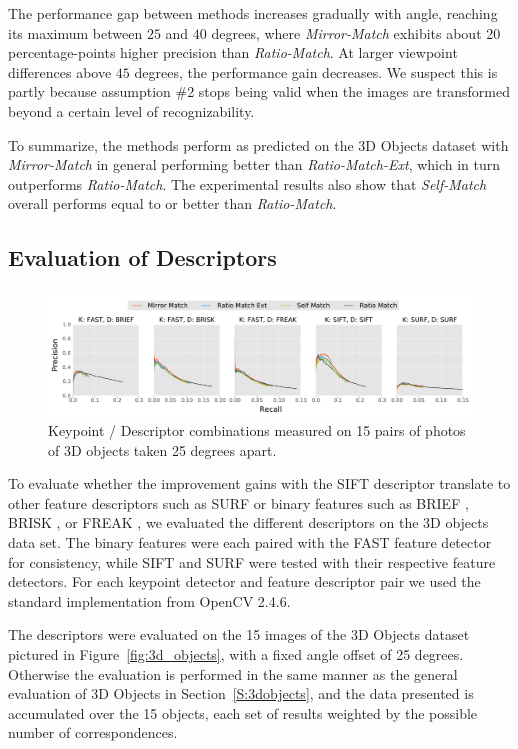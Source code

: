 \documentclass[review]{elsarticle}
\begin{document}
The performance gap between methods increases gradually with angle, reaching its maximum between $25$ and $40$ degrees, where \emph{Mirror-Match} exhibits about 20 percentage-points higher precision than \emph{Ratio-Match}. At larger viewpoint differences above $45$ degrees, the performance gain decreases.  We suspect this is partly because assumption \#2 stops being valid when the images are transformed beyond a certain level of recognizability.

To summarize, the methods perform as predicted on the 3D Objects dataset with \emph{Mirror-Match} in general performing better than \emph{Ratio-Match-Ext}, which in turn outperforms \emph{Ratio-Match}. The experimental results also show that \emph{Self-Match} overall performs equal to or better than \emph{Ratio-Match}.

\subsection{Evaluation of Descriptors}
\label{label:desc}

\begin{figure}[t]
    \centering
    \includegraphics[width=\columnwidth]{images/results_descriptors_imageset1}
    \caption{Keypoint / Descriptor combinations measured on 15 pairs of 
    photos of 3D objects taken 25 degrees apart.}
    \label{fig:descriptors}
\end{figure}

To evaluate whether the improvement gains with the SIFT descriptor translate to other feature descriptors such as SURF \cite{bay2006surf} or binary features such as BRIEF \cite{calonder2010brief}, BRISK \cite{leutenegger2011brisk}, or FREAK \cite{alahi2012freak}, we evaluated the different descriptors on the 3D objects data set.  The binary features were each paired with the FAST feature detector for consistency, while SIFT and SURF were tested with their respective feature detectors.  For each keypoint detector and feature descriptor pair we used the standard implementation from OpenCV 2.4.6.

The descriptors were evaluated on the 15 images  of the 3D Objects dataset pictured in Figure~\ref{fig:3d_objects}, with a fixed angle offset of 25 degrees.  Otherwise the evaluation is performed in the same manner as the general evaluation of 3D Objects in Section~\ref{S:3dobjects}, and the data presented is accumulated over the 15 objects, each set of results weighted by the possible number of correspondences.
\end{document}
